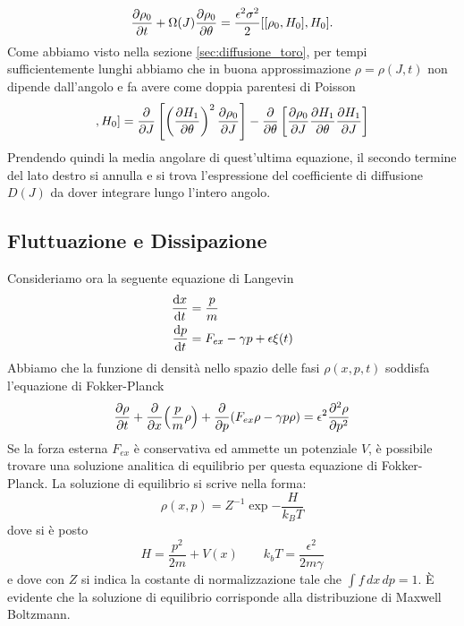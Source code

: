 \documentclass[10pt,a4paper]{article}
\begin{document}
\begin{equation}
 	\pdv{\rho_0}{t} + \Omega (J) \pdv{\rho_0}{\theta} = \frac{\epsilon^2 \sigma^2}{2}[[\rho_0, H_0], H_0].
\end{equation} 
Come abbiamo visto nella sezione \ref{sec:diffusione_toro}, per tempi sufficientemente lunghi abbiamo che in buona approssimazione \(\rho = \rho(J,t)\) non dipende dall'angolo e fa avere come doppia parentesi di Poisson
\begin{equation}
	[[\rho_0, H_0], H_0] = \pdv{}{J}\left[\left(\pdv{H_1}{\theta}\right)^2 \pdv{\rho_0}{J}\right] - \pdv{}{\theta}\left[\pdv{\rho_0}{J}\pdv{H_1}{\theta}\pdv{H_1}{J}\right]
\end{equation}
Prendendo quindi la media angolare di quest'ultima equazione, il secondo termine del lato destro si annulla e si trova l'espressione del coefficiente di diffusione \(D(J)\) da dover integrare lungo l'intero angolo.

\subsection{Fluttuazione e Dissipazione}
\label{sec:fluttuazione_dissipazione}
Consideriamo ora la seguente equazione di Langevin
\begin{align}
	\dv{x}{t} &= \frac{p}{m}\\
	\dv{p}{t} &= F_{ex} - \gamma p + \epsilon\xi(t)
\end{align}
Abbiamo che la funzione di densità nello spazio delle fasi \(\rho(x,p,t)\) soddisfa l'equazione di Fokker-Planck
\begin{equation}
	\pdv{\rho}{t} + \pdv{x} (\frac{p}{m}\rho) + \pdv{p} (F_{ex}\rho - \gamma p \rho) = \epsilon^2\pdv[2]{\rho}{p}
\end{equation}
Se la forza esterna \(F_{ex}\) è conservativa ed ammette un potenziale \(V\), è possibile trovare una soluzione analitica di equilibrio per questa equazione di Fokker-Planck. La soluzione di equilibrio si scrive nella forma:
\begin{equation}
	\rho(x,p) = Z^{-1} \exp{-\frac{H}{k_B T}}
\end{equation}
dove si è posto
\begin{equation}
	H = \frac{p^2}{2m} + V(x) \quad\quad k_b T = \frac{\epsilon^2}{2 m \gamma}
\end{equation}
e dove con \(Z\) si indica la costante di normalizzazione tale che \(\int f\,dx\,dp = 1\). È evidente che la soluzione di equilibrio corrisponde alla distribuzione di Maxwell Boltzmann.
\end{document}
